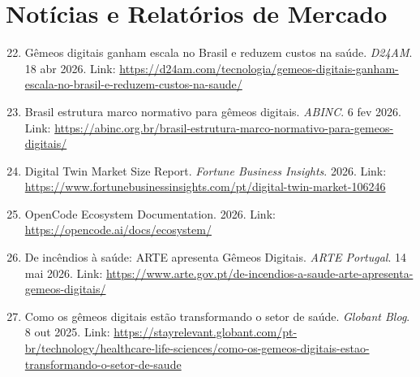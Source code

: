\section{Notícias e Relatórios de Mercado}

\begin{enumerate}
    \setcounter{enumi}{21}
    \item \label{ref:d24am2026} Gêmeos digitais ganham escala no Brasil e reduzem custos na saúde. \textit{D24AM}. 18 abr 2026. Link: \url{https://d24am.com/tecnologia/gemeos-digitais-ganham-escala-no-brasil-e-reduzem-custos-na-saude/}
    
    \item \label{ref:abinc2026} Brasil estrutura marco normativo para gêmeos digitais. \textit{ABINC}. 6 fev 2026. Link: \url{https://abinc.org.br/brasil-estrutura-marco-normativo-para-gemeos-digitais/}
    
    \item \label{ref:fortune2026} Digital Twin Market Size Report. \textit{Fortune Business Insights}. 2026. Link: \url{https://www.fortunebusinessinsights.com/pt/digital-twin-market-106246}
    
    \item \label{ref:opencode2026} OpenCode Ecosystem Documentation. 2026. Link: \url{https://opencode.ai/docs/ecosystem/}
    
    \item \label{ref:arte2026} De incêndios à saúde: ARTE apresenta Gêmeos Digitais. \textit{ARTE Portugal}. 14 mai 2026. Link: \url{https://www.arte.gov.pt/de-incendios-a-saude-arte-apresenta-gemeos-digitais/}
    
    \item \label{ref:globant2025} Como os gêmeos digitais estão transformando o setor de saúde. \textit{Globant Blog}. 8 out 2025. Link: \url{https://stayrelevant.globant.com/pt-br/technology/healthcare-life-sciences/como-os-gemeos-digitais-estao-transformando-o-setor-de-saude}
\end{enumerate}
